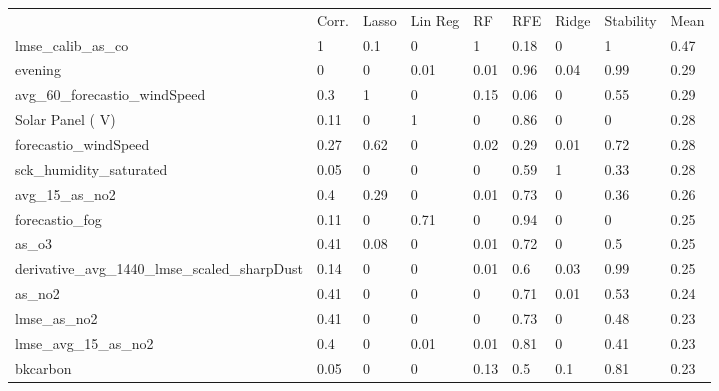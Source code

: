 \begin{table}[H]
\centering
\tiny
\begin{tabular}{lllllllll}
\\
\\
\toprule
     & Corr. & Lasso & Lin Reg & RF   & RFE  & Ridge & Stability & Mean \\
\midrule
lmse\_calib\_as\_co                            & 1     & 0.1   & 0          & 1    & 0.18 & 0     & 1         & 0.47 \\
evening                                        & 0     & 0     & 0.01       & 0.01 & 0.96 & 0.04  & 0.99      & 0.29 \\
avg\_60\_forecastio\_windSpeed                 & 0.3   & 1     & 0          & 0.15 & 0.06 & 0     & 0.55      & 0.29 \\
Solar Panel ( V)                               & 0.11  & 0     & 1          & 0    & 0.86 & 0     & 0         & 0.28 \\
forecastio\_windSpeed                          & 0.27  & 0.62  & 0          & 0.02 & 0.29 & 0.01  & 0.72      & 0.28 \\
sck\_humidity\_saturated                       & 0.05  & 0     & 0          & 0    & 0.59 & 1     & 0.33      & 0.28 \\
avg\_15\_as\_no2                               & 0.4   & 0.29  & 0          & 0.01 & 0.73 & 0     & 0.36      & 0.26 \\
forecastio\_fog                                & 0.11  & 0     & 0.71       & 0    & 0.94 & 0     & 0         & 0.25 \\
as\_o3                                         & 0.41  & 0.08  & 0          & 0.01 & 0.72 & 0     & 0.5       & 0.25 \\
derivative\_avg\_1440\_lmse\_scaled\_sharpDust & 0.14  & 0     & 0          & 0.01 & 0.6  & 0.03  & 0.99      & 0.25 \\
as\_no2                                        & 0.41  & 0     & 0          & 0    & 0.71 & 0.01  & 0.53      & 0.24 \\
lmse\_as\_no2                                  & 0.41  & 0     & 0          & 0    & 0.73 & 0     & 0.48      & 0.23 \\
lmse\_avg\_15\_as\_no2                         & 0.4   & 0     & 0.01       & 0.01 & 0.81 & 0     & 0.41      & 0.23 \\
bkcarbon                                       & 0.05  & 0     & 0          & 0.13 & 0.5  & 0.1   & 0.81      & 0.23 \\

\end{tabular}
\end{table}
